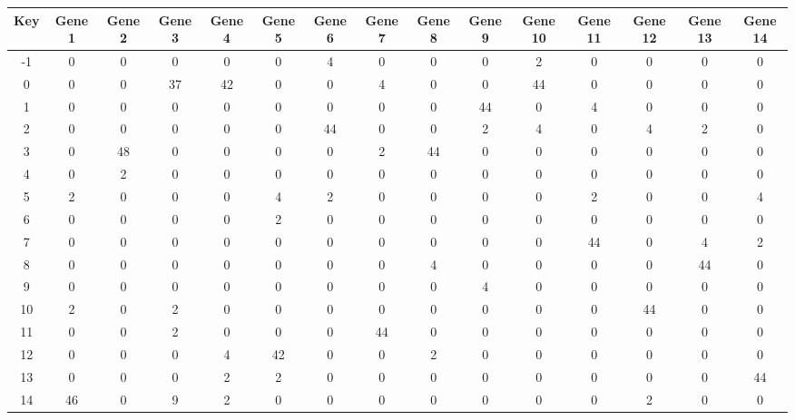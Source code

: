 \begin{tabular}{|c|c|c|c|c|c|c|c|c|c|c|c|c|c|c|}
\hline
Key & Gene 1 & Gene 2 & Gene 3 & Gene 4 & Gene 5 & Gene 6 & Gene 7 & Gene 8 & Gene 9 & Gene 10 & Gene 11 & Gene 12 & Gene 13 & Gene 14 \\
\hline
-1 & 0 & 0 & 0 & 0 & 0 & 4 & 0 & 0 & 0 & 2 & 0 & 0 & 0 & 0 \\
0 & 0 & 0 & 37 & 42 & 0 & 0 & 4 & 0 & 0 & 44 & 0 & 0 & 0 & 0 \\
1 & 0 & 0 & 0 & 0 & 0 & 0 & 0 & 0 & 44 & 0 & 4 & 0 & 0 & 0 \\
2 & 0 & 0 & 0 & 0 & 0 & 44 & 0 & 0 & 2 & 4 & 0 & 4 & 2 & 0 \\
3 & 0 & 48 & 0 & 0 & 0 & 0 & 2 & 44 & 0 & 0 & 0 & 0 & 0 & 0 \\
4 & 0 & 2 & 0 & 0 & 0 & 0 & 0 & 0 & 0 & 0 & 0 & 0 & 0 & 0 \\
5 & 2 & 0 & 0 & 0 & 4 & 2 & 0 & 0 & 0 & 0 & 2 & 0 & 0 & 4 \\
6 & 0 & 0 & 0 & 0 & 2 & 0 & 0 & 0 & 0 & 0 & 0 & 0 & 0 & 0 \\
7 & 0 & 0 & 0 & 0 & 0 & 0 & 0 & 0 & 0 & 0 & 44 & 0 & 4 & 2 \\
8 & 0 & 0 & 0 & 0 & 0 & 0 & 0 & 4 & 0 & 0 & 0 & 0 & 44 & 0 \\
9 & 0 & 0 & 0 & 0 & 0 & 0 & 0 & 0 & 4 & 0 & 0 & 0 & 0 & 0 \\
10 & 2 & 0 & 2 & 0 & 0 & 0 & 0 & 0 & 0 & 0 & 0 & 44 & 0 & 0 \\
11 & 0 & 0 & 2 & 0 & 0 & 0 & 44 & 0 & 0 & 0 & 0 & 0 & 0 & 0 \\
12 & 0 & 0 & 0 & 4 & 42 & 0 & 0 & 2 & 0 & 0 & 0 & 0 & 0 & 0 \\
13 & 0 & 0 & 0 & 2 & 2 & 0 & 0 & 0 & 0 & 0 & 0 & 0 & 0 & 44 \\
14 & 46 & 0 & 9 & 2 & 0 & 0 & 0 & 0 & 0 & 0 & 0 & 2 & 0 & 0 \\
\hline
\end{tabular}